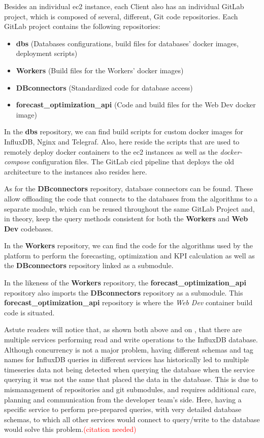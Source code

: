 Besides an individual \gls{ec2} instance, each Client also has an individual GitLab \parencite{gitlab_2022} project, which is composed of several, different, Git \parencite{git} code repositories. Each GitLab project contains the following repositories:

\begin{itemize}

    \item \textbf{dbs} (Databases configurations, build files for databases' docker images, deployment scripts)
    \item \textbf{Workers} (Build files for the Workers' docker images)
    \item \textbf{DBconnectors} (Standardized code for database access)
    \item \textbf{forecast\_optimization\_api} (Code and build files for the Web Dev docker image)
    
\end{itemize}

In the \textbf{dbs} repository, we can find build scripts for custom docker images for InfluxDB, Nginx and Telegraf. Also, here reside the scripts that are used to remotely deploy docker containers to the \gls{ec2} instances as well as the \textit{docker-compose} configuration files. The GitLab \gls{cicd} pipeline that deploys the old architecture to the instances also resides here.

As for the \textbf{DBconnectors} repository, database connectors can be found. These allow offloading the code that connects to the databases from the algorithms to a separate module, which can be reused throughout the same GitLab Project and, in theory, keep the query methods consistent for both the \textbf{Workers} and \textbf{Web Dev} codebases.

In the \textbf{Workers} repository, we can find the code for the algorithms used by the platform to perform the forecasting, optimization and KPI calculation as well as the \textbf{DBconnectors} repository linked as a submodule.

In the likeness of the \textbf{Workers} repository, the \textbf{forecast\_optimization\_api} repository also imports the \textbf{DBconnectors} repository as a submodule. This \textbf{forecast\_optimization\_api} repository is where the \textit{Web Dev} container build code is situated. 

Astute readers will notice that, as shown both above and on , that there are multiple services performing read and write operations to the InfluxDB database. Although concurrency is not a major problem, having different schemas and tag names for InfluxDB queries in different services has historically led to multiple timeseries data not being detected when querying the database when the service querying it was not the same that placed the data in the database. This is due to mismanagement of repositories and git submodules, and requires additional care, planning and communication from the developer team's side. Here, having a specific service to perform pre-prepared queries, with very detailed database schemas, to which all other services would connect to query/write to the database would solve this problem.\textcolor{red}{(citation needed)}

